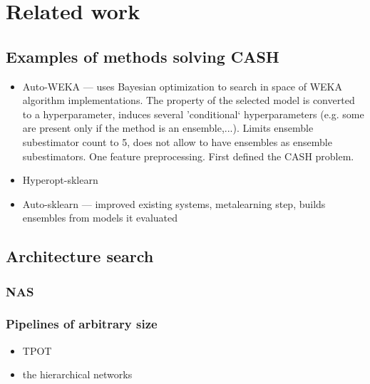 \chapter{Related work} \label{ch2:related}

\section{Examples of methods solving CASH}
\begin{itemize}
\item Auto-WEKA --- uses Bayesian optimization to search in space of WEKA
algorithm implementations. The property of the selected model is converted to
a hyperparameter, induces several 'conditional` hyperparameters (e.g. some are
present only if the method is an ensemble,...). Limits ensemble subestimator count
to 5, does not allow to have ensembles as ensemble subestimators. One feature
preprocessing. First defined the CASH problem.

\item Hyperopt-sklearn %
\item Auto-sklearn --- improved existing systems, metalearning step, builds
ensembles from models it evaluated
\end{itemize}

\section{Architecture search}
\subsection{NAS} %

\subsection{Pipelines of arbitrary size}
\begin{itemize}
\item TPOT
\item the hierarchical networks
\end{itemize}

